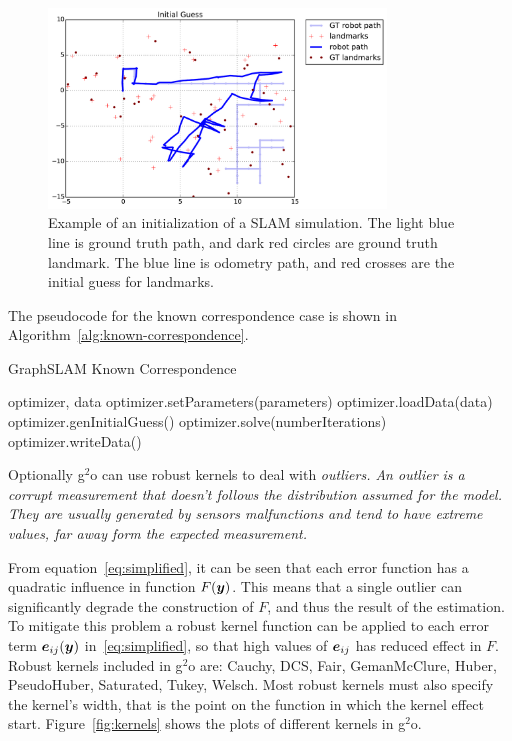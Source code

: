 \begin{figure}[htbp!]
    \centering
    \includegraphics[width=0.8\textwidth]{imagenes/guess_op_100_oa_100_lp_100_ds_100.pdf}
    \caption[Example of an initialization of a SLAM simulation.]{Example of an initialization of a SLAM simulation. The light blue line is ground truth path, and dark red circles are ground truth landmark. The blue line is odometry path, and red crosses are the initial guess for landmarks.}
    \label{fig:simulation}
\end{figure}

The pseudocode for the known correspondence case is shown in Algorithm~\ref{alg:known-correspondence}.

\begin{algorithm}[htbp!]
    \caption{GraphSLAM Known Correspondence}
    \label{alg:known-correspondence}
    \begin{algorithmic}[1]
        \Require optimizer, data
        \State optimizer.setParameters(parameters)
        \State optimizer.loadData(data)
        \State optimizer.genInitialGuess()
        \State optimizer.solve(numberIterations)
        \State optimizer.writeData()
    \end{algorithmic}
\end{algorithm}

Optionally g$^2$o can use robust kernels to deal with \it{outliers}. An outlier is a corrupt measurement that doesn't follows the distribution assumed for the model. They are usually generated by sensors malfunctions and tend to have extreme values, far away form the expected measurement. 

From equation~\eqref{eq:simplified}, it can be seen that each error function has a quadratic influence in function $F(\boldsymbol{y})$. This means that a single outlier can significantly degrade the construction of $F$, and thus the result of the estimation. To mitigate this problem a robust kernel function can be applied to each error term $\boldsymbol{e}_{ij}(\boldsymbol{y})$ in~\eqref{eq:simplified}, so that high values of $\boldsymbol{e}_{ij}$ has reduced effect in $F$. Robust kernels included in g$^2$o are: Cauchy, DCS, Fair, GemanMcClure, Huber, PseudoHuber, Saturated, Tukey, Welsch. Most robust kernels must also specify the kernel's width, that is the point on the function in which the kernel effect start. Figure~\ref{fig:kernels} shows the plots of different kernels in g$^2$o. 

